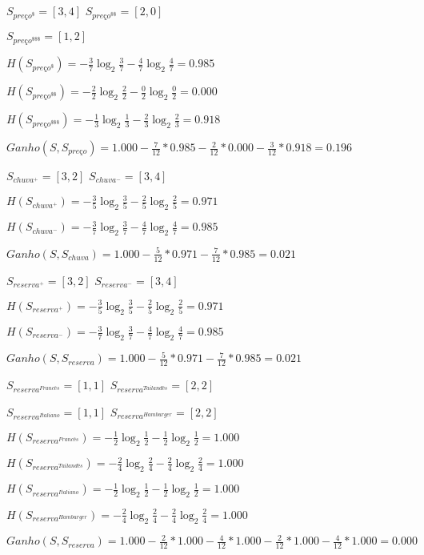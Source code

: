 \vskip 0.3in
\par $S_{preço^{\$}} = [3,4]$ \qquad $S_{preço^{\$\$}} = [2,0]$\par $S_{preço^{\$\$\$}} = [1,2]$
\par $H(S_{preço^{\$}}) = -\frac{3}{7} \log_2 \frac{3}{7}- \frac{4}{7} \log_2 \frac{4}{7} = 0.985$
\par $H(S_{preço^{\$\$}}) = -\frac{2}{2} \log_2 \frac{2}{2}- \frac{0}{2} \log_2 \frac{0}{2} = 0.000$
\par $H(S_{preço^{\$\$\$}}) = -\frac{1}{3} \log_2 \frac{1}{3}- \frac{2}{3} \log_2 \frac{2}{3} = 0.918$
\par $Ganho(S, S_{preço}) = 1.000-\frac{7}{12} * 0.985-\frac{2}{12} * 0.000-\frac{3}{12} * 0.918 = 0.196$

\vskip 0.3in
\par $S_{chuva^{+}} = [3,2]$ \qquad $S_{chuva^{-}} = [3,4]$
\par $H(S_{chuva^{+}}) = -\frac{3}{5} \log_2 \frac{3}{5}- \frac{2}{5} \log_2 \frac{2}{5} = 0.971$
\par $H(S_{chuva^{-}}) = -\frac{3}{7} \log_2 \frac{3}{7}- \frac{4}{7} \log_2 \frac{4}{7} = 0.985$
\par $Ganho(S, S_{chuva}) = 1.000-\frac{5}{12} * 0.971-\frac{7}{12} * 0.985 = 0.021$

\vskip 0.3in
\par $S_{reserva^{+}} = [3,2]$ \qquad $S_{reserva^{-}} = [3,4]$
\par $H(S_{reserva^{+}}) = -\frac{3}{5} \log_2 \frac{3}{5}- \frac{2}{5} \log_2 \frac{2}{5} = 0.971$
\par $H(S_{reserva^{-}}) = -\frac{3}{7} \log_2 \frac{3}{7}- \frac{4}{7} \log_2 \frac{4}{7} = 0.985$
\par $Ganho(S, S_{reserva}) = 1.000-\frac{5}{12} * 0.971-\frac{7}{12} * 0.985 = 0.021$

\vskip 0.3in
\par $S_{reserva^{Francês}} = [1,1]$ \qquad $S_{reserva^{Tailandês}} = [2,2]$\par $S_{reserva^{Italiano}} = [1,1]$ \qquad $S_{reserva^{Hamburger}} = [2,2]$
\par $H(S_{reserva^{Francês}}) = -\frac{1}{2} \log_2 \frac{1}{2}- \frac{1}{2} \log_2 \frac{1}{2} = 1.000$
\par $H(S_{reserva^{Tailandês}}) = -\frac{2}{4} \log_2 \frac{2}{4}- \frac{2}{4} \log_2 \frac{2}{4} = 1.000$
\par $H(S_{reserva^{Italiano}}) = -\frac{1}{2} \log_2 \frac{1}{2}- \frac{1}{2} \log_2 \frac{1}{2} = 1.000$
\par $H(S_{reserva^{Hamburger}}) = -\frac{2}{4} \log_2 \frac{2}{4}- \frac{2}{4} \log_2 \frac{2}{4} = 1.000$
\par $Ganho(S, S_{reserva}) = 1.000-\frac{2}{12} * 1.000-\frac{4}{12} * 1.000-\frac{2}{12} * 1.000-\frac{4}{12} * 1.000 = 0.000$


